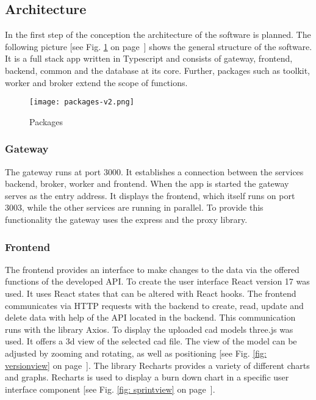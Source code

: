     \subsection*{Architecture}
    In the first step of the conception the architecture of the software is planned. The following picture [see Fig. \ref{fig: packages} on page~\pageref{fig: packages}] shows the general structure of the software. It is a full stack app written in Typescript and consists of gateway, frontend, backend, common and the database at its core. Further, packages such as toolkit, worker and broker extend the scope of functions.
    
    \begin{figure}[h]
        \centering
        \texttt{[image: packages-v2.png]}
        \caption{Packages}
        \label{fig: packages}
    \end{figure}

    \subsubsection*{Gateway}
    The gateway runs at port 3000. It establishes a connection between the services backend, broker, worker and frontend. When the app is started the gateway serves as the entry address. It displays the frontend, which itself runs on port 3003, while the other services are running in parallel. To provide this functionality the gateway uses the express and the proxy library.  
  
    \subsubsection*{Frontend}
    The frontend provides an interface to make changes to the data via the offered functions of the developed API. To create the user interface React version 17 was used. It uses React states that can be altered with React hooks. The frontend communicates via HTTP requests with the backend to create, read, update and delete data with help of the API located in the backend. This communication runs with the library Axios. To display the uploaded cad models three.js was used. It offers a 3d view of the selected cad file. The view of the model can be adjusted by zooming and rotating, as well as positioning [see Fig. \ref{fig: versionview} on page~\pageref{fig: versionview}]. The library Recharts provides a variety of different charts and graphs. Recharts is used to display a burn down chart in a specific user interface component [see Fig. \ref{fig: sprintview} on page~\pageref{fig: sprintview}].

